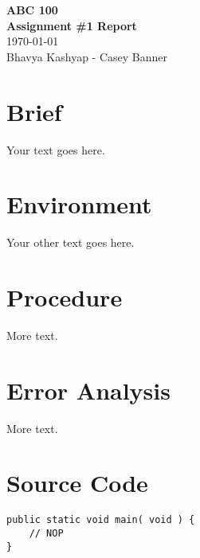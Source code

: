 \documentclass[10pt]{article} %
\def\groupmembers#1#2{{#1 - #2}}
\def\fulltitle#1#2#3#4{\begin{center}{{\Large \textbf{#1\\#2}}\\#3\\{\small#4}}\end{center}}
\def\brief{\section*{Brief}}
\def\environment{\section*{Environment}}
\def\error{\section*{Error Analysis}}
\def\nsection#1{\section*{#1}}
\def\ncitation#1{\newpage\section*{#1}}
\def\courseident {{ABC}}
\def\coursenumber{{100}}
\def\assignmenttitle{{Assignment \#1 Report}}
\def\fullcourse{{\courseident} {\coursenumber}}
\def\assignmentauthors{\groupmembers{Bhavya Kashyap}{Casey Banner}}
\begin{document}
\fulltitle{\fullcourse}{\assignmenttitle}{\today}{\assignmentauthors}

\brief

Your text goes here.

\environment

Your other text goes here.

\nsection{Procedure}

More text.

\error

More text.

\ncitation{Source Code}
\begin{verbatim}
public static void main( void ) {
	// NOP
}
\end{verbatim}
\end{document}
